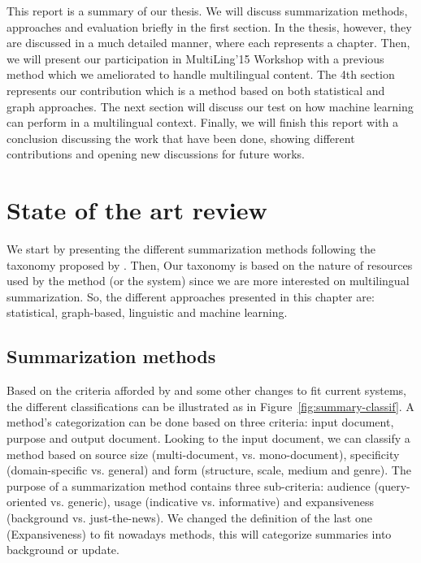 \documentclass[12pt, oneside, a4paper]{article}
\begin{document}
This report is a summary of our thesis. 
We will discuss summarization methods, approaches and evaluation briefly in the first section. 
In the thesis, however, they are discussed in a much detailed manner, where each represents a chapter. 
Then, we will present our participation in MultiLing'15 Workshop with a previous method which we ameliorated to handle multilingual content. 
The 4th section represents our contribution which is a method based on both statistical and graph approaches. 
The next section will discuss our test on how machine learning can perform in a multilingual context. 
Finally, we will finish this report with a conclusion discussing the work that have been done, showing different contributions and opening new discussions for future works.


\section{State of the art review}

We start by presenting the different summarization methods following the taxonomy proposed by \citet{98-hovy-lin,99-sparckjones}. 
Then, 
Our taxonomy is based on the nature of resources used by the method (or the system) since we are more interested on multilingual summarization. 
So, the different approaches presented in this chapter are: statistical, graph-based, linguistic and machine learning. 

\subsection{Summarization methods}

Based on the criteria afforded by \citet{98-hovy-lin} and some other changes to fit current systems, the different classifications can be illustrated as in Figure~\ref{fig:summary-classif}.
A method's categorization can be done based on three criteria: input document, purpose and output document. 
Looking to the input document, we can classify a method based on source size (multi-document, vs. mono-document), specificity (domain-specific vs. general) and form (structure, scale, medium and genre). 
The purpose of a summarization method contains three sub-criteria: audience (query-oriented vs. generic), usage (indicative vs. informative) and expansiveness (background vs. just-the-news).
We changed the definition of the last one (Expansiveness) to fit nowadays methods, this will categorize summaries into background or update.
\end{document}
